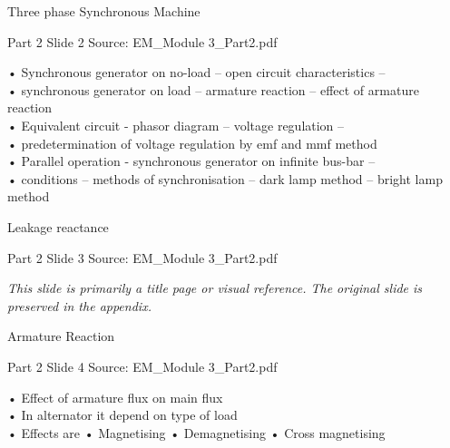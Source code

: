 \documentclass[11pt,a4paper]{article}
\begin{document}
\begin{mdframed}[roundcorner=9pt,backgroundcolor=white,linecolor=anthOrange,linewidth=1pt,innerleftmargin=12pt,innerrightmargin=12pt,innertopmargin=10pt,innerbottommargin=10pt,skipabove=8pt,skipbelow=10pt]
{\HeadingFont\fontsize{15}{18}\selectfont\color{anthDark}Three phase Synchronous Machine\par}
{\color{anthMid}\small Part 2 \textbullet{} Slide 2 \textbullet{} Source: EM\_Module 3\_Part2.pdf\par}
\vspace{0.5em}
{\small
• Synchronous generator on no-load – open circuit characteristics –\\
• synchronous generator on load – armature reaction – effect of armature reaction\\
• Equivalent circuit - phasor diagram – voltage regulation –\\
• predetermination of voltage regulation by emf and mmf method\\
• Parallel operation - synchronous generator on infinite bus-bar –\\
• conditions – methods of synchronisation – dark lamp method – bright lamp method\\

}
\end{mdframed}

\begin{mdframed}[roundcorner=9pt,backgroundcolor=white,linecolor=anthBlue,linewidth=1pt,innerleftmargin=12pt,innerrightmargin=12pt,innertopmargin=10pt,innerbottommargin=10pt,skipabove=8pt,skipbelow=10pt]
{\HeadingFont\fontsize{15}{18}\selectfont\color{anthDark}Leakage reactance\par}
{\color{anthMid}\small Part 2 \textbullet{} Slide 3 \textbullet{} Source: EM\_Module 3\_Part2.pdf\par}
\vspace{0.5em}
{\small
\textit{This slide is primarily a title page or visual reference. The original slide is preserved in the appendix.}

}
\end{mdframed}

\begin{mdframed}[roundcorner=9pt,backgroundcolor=white,linecolor=anthGreen,linewidth=1pt,innerleftmargin=12pt,innerrightmargin=12pt,innertopmargin=10pt,innerbottommargin=10pt,skipabove=8pt,skipbelow=10pt]
{\HeadingFont\fontsize{15}{18}\selectfont\color{anthDark}Armature Reaction\par}
{\color{anthMid}\small Part 2 \textbullet{} Slide 4 \textbullet{} Source: EM\_Module 3\_Part2.pdf\par}
\vspace{0.5em}
{\small
• Effect of armature flux on main flux\\
• In alternator it depend on type of load\\
• Effects are • Magnetising • Demagnetising • Cross magnetising\\

}
\end{mdframed}
\end{document}
